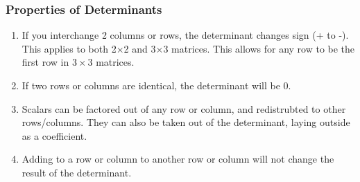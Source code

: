 \documentclass{article}
\begin{document}
          \subsubsection{Properties of Determinants}
          \begin{enumerate}
            \item If you interchange 2 columns or rows, the determinant changes sign (+ to -). This applies
              to both 2$\times$2 and 3$\times$3 matrices. This allows for any row to be the first row in $3\times3$ matrices.
              \item If two rows or columns are identical, the determinant will be 0.
              \item Scalars can be factored out of any row or column, and redistrubted to other rows/columns. They can also be taken out of the determinant, laying outside as a coefficient.
                \item Adding to a row or column to another row or column will not change the result of the determinant.
          \end{enumerate}
\end{document}
